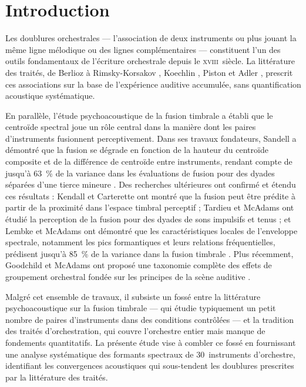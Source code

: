 \documentclass[12pt,a4paper]{article}
\begin{document}
\section{Introduction}

Les doublures orchestrales --- l'association de deux instruments ou plus jouant la
même ligne mélodique ou des lignes complémentaires --- constituent l'un des outils
fondamentaux de l'écriture orchestrale depuis le \textsc{xviii}\ieme~siècle. La
littérature des traités, de Berlioz \citep{Berlioz1844} à Rimsky-Korsakov
\citep{RimskyKorsakov1908}, Koechlin \citep{Koechlin1943}, Piston
\citep{Piston1955} et Adler \citep{Adler1982}, prescrit ces associations sur la
base de l'expérience auditive accumulée, sans quantification acoustique systématique.

En parallèle, l'étude psychoacoustique de la fusion timbrale a établi que le
centroïde spectral joue un rôle central dans la manière dont les paires d'instruments
fusionnent perceptivement. Dans ses travaux fondateurs, Sandell a démontré que la
fusion se dégrade en fonction de la hauteur du centroïde composite et de la différence
de centroïde entre instruments, rendant compte de jusqu'à 63~\% de la variance dans
les évaluations de fusion pour des dyades séparées d'une tierce mineure
\citep{Sandell1991,Sandell1995}. Des recherches ultérieures ont confirmé et étendu
ces résultats : Kendall et Carterette ont montré que la fusion peut être prédite à
partir de la proximité dans l'espace timbral perceptif \citep{Kendall1993} ; Tardieu
et McAdams ont étudié la perception de la fusion pour des dyades de sons impulsifs et
tenus \citep{Tardieu2012} ; et Lembke et McAdams ont démontré que les caractéristiques
locales de l'enveloppe spectrale, notamment les pics formantiques et leurs relations
fréquentielles, prédisent jusqu'à 85~\% de la variance dans la fusion timbrale
\citep{Lembke2017}. Plus récemment, Goodchild et McAdams ont proposé une taxonomie
complète des effets de groupement orchestral fondée sur les principes de la scène
auditive \citep{Goodchild2018,McAdams2022}.

Malgré cet ensemble de travaux, il subsiste un fossé entre la littérature
psychoacoustique sur la fusion timbrale --- qui étudie typiquement un petit nombre de
paires d'instruments dans des conditions contrôlées --- et la tradition des traités
d'orchestration, qui couvre l'orchestre entier mais manque de fondements quantitatifs.
La présente étude vise à combler ce fossé en fournissant une analyse systématique des
formants spectraux de 30~instruments d'orchestre, identifiant les convergences
acoustiques qui sous-tendent les doublures prescrites par la littérature des traités.
\end{document}

